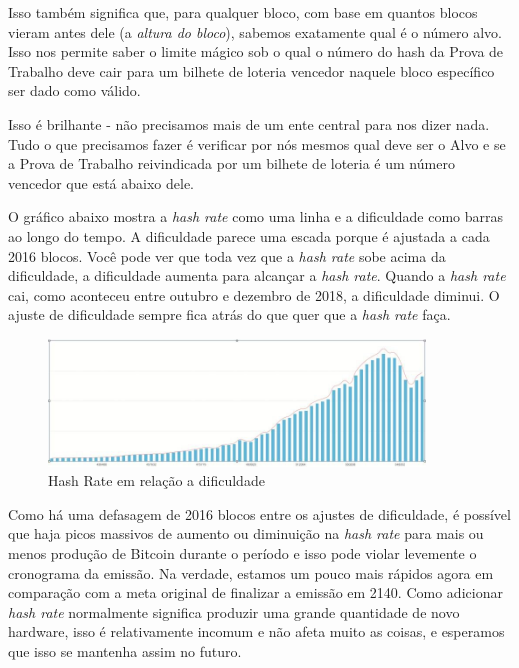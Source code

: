 Isso também significa que, para qualquer bloco, com base em quantos blocos vieram antes dele (a \textit{altura do bloco}), sabemos exatamente qual é o número alvo. Isso nos permite saber o limite mágico sob o qual o número do hash da Prova de Trabalho deve cair para um bilhete de loteria vencedor naquele bloco específico ser dado como válido.

Isso é brilhante - não precisamos mais de um ente central para nos dizer nada. Tudo o que precisamos fazer é verificar por nós mesmos qual deve ser o Alvo e se a Prova de Trabalho reivindicada por um bilhete de loteria é um número vencedor que está abaixo dele.

O gráfico abaixo mostra a \textit{hash rate} como uma linha e a dificuldade como barras ao longo do tempo. A dificuldade parece uma escada porque é ajustada a cada 2016 blocos. Você pode ver que toda vez que a \textit{hash rate} sobe acima da dificuldade, a dificuldade aumenta para alcançar a \textit{hash rate}. Quando a \textit{hash rate} cai, como aconteceu entre outubro e dezembro de 2018, a dificuldade diminui. O ajuste de dificuldade sempre fica atrás do que quer que a \textit{hash rate} faça.

\begin{figure}
  \centering
  \includegraphics[width=10cm]{imagens/grafico3-capitulo-05.jpg}
  \caption{Hash Rate em relação a dificuldade}
\end{figure}

Como há uma defasagem de 2016 blocos entre os ajustes de dificuldade, é possível que haja picos massivos de aumento ou diminuição na \textit{hash rate} para mais ou menos produção de Bitcoin durante o período e isso pode violar levemente o cronograma da emissão. Na verdade, estamos um pouco mais rápidos agora em comparação com a meta original de finalizar a emissão em 2140. Como adicionar \textit{hash rate} normalmente significa produzir uma grande quantidade de novo hardware, isso é relativamente incomum e não afeta muito as coisas, e esperamos que isso se mantenha assim no futuro.

